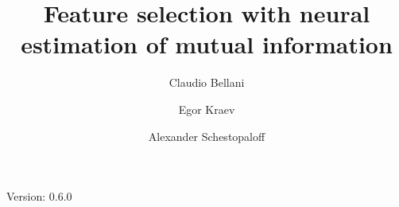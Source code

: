 \documentclass{mypaper}
\author[1]{
Claudio Bellani
}
\author[2]{
Egor Kraev
}
\author[1]{
Alexander Schestopaloff
}
\affil[1]{
	Queen Mary University of London
}
\affil[2]{
	Wise Payments Ltd.
}
\title{Feature selection with neural estimation of mutual information}
\begin{document}
\maketitle

Version: 0.6.0







\end{document}
